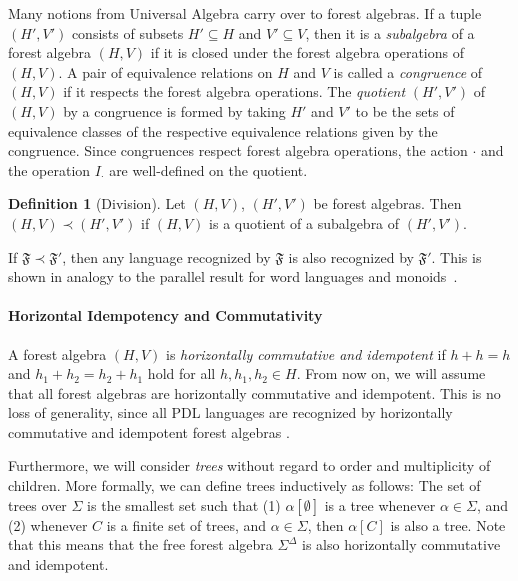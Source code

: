 \documentclass[sigplan,9pt]{acmart}\settopmatter{printfolios=true,printccs=false,printacmref=false}
\newcounter{thm}
\newcounter{theorem}
\theoremstyle{definition}
\newtheorem{defin}[thm]{Definition}
\newcommand{\Ff}[0]{{\mathfrak{F}}}
\begin{document}
Many notions from Universal Algebra carry over to forest algebras.
If a tuple $(H',V')$ consists of subsets $H' \subseteq H$ and $V' \subseteq V$, then it is a \emph{subalgebra} of a forest algebra $(H,V)$ if it is closed under the forest algebra operations of $(H,V)$.
A pair of equivalence relations on $H$ and $V$ is called a \emph{congruence} of $(H,V)$ if it respects the forest algebra operations.
The \emph{quotient} $(H',V')$ of $(H,V)$ by a congruence is formed by taking $H'$ and $V'$ to be the sets of equivalence classes of the respective equivalence relations given by the congruence.
Since congruences respect forest algebra operations, the action $\cdot$ and the operation $I_\cdot$ are well-defined on the quotient.

\begin{defin}[Division]
Let $(H,V)$, $(H', V')$ be forest algebras. Then $(H,V) \prec (H', V')$ if $(H,V)$ is a quotient of a subalgebra of $(H',V')$.
\end{defin}



If $\Ff \prec \Ff'$, then any language recognized by $\Ff$ is also recognized by $\Ff'$. This is shown in analogy to the parallel result for word languages and monoids~\cite{eilenberg-automata-1976}.

\paragraph{Horizontal Idempotency and Commutativity}
A forest algebra $(H,V)$ is \emph{horizontally commutative and idempotent} if $h+h = h$ and $h_1+h_2 = h_2+h_1$ hold for all $h, h_1, h_2 \in H$.
From now on, we will assume that all forest algebras are horizontally commutative and idempotent.
This is no loss of generality, since all PDL languages are recognized by horizontally commutative and idempotent forest algebras \cite{bojanczyk-wreath-2012}.

Furthermore, we will consider \emph{trees} without regard to order and multiplicity of children. %
More formally, we can define trees inductively as follows: The set of trees over $\Sigma$ is the smallest set such that (1) $\alpha[\emptyset]$ is a tree whenever $\alpha\in\Sigma$, and (2) whenever $C$ is a finite set of trees, and $\alpha \in \Sigma$, then $\alpha[C]$ is also a tree.
%
Note that this means that the free forest algebra $\Sigma^\Delta$ is also horizontally commutative and idempotent.
\end{document}
